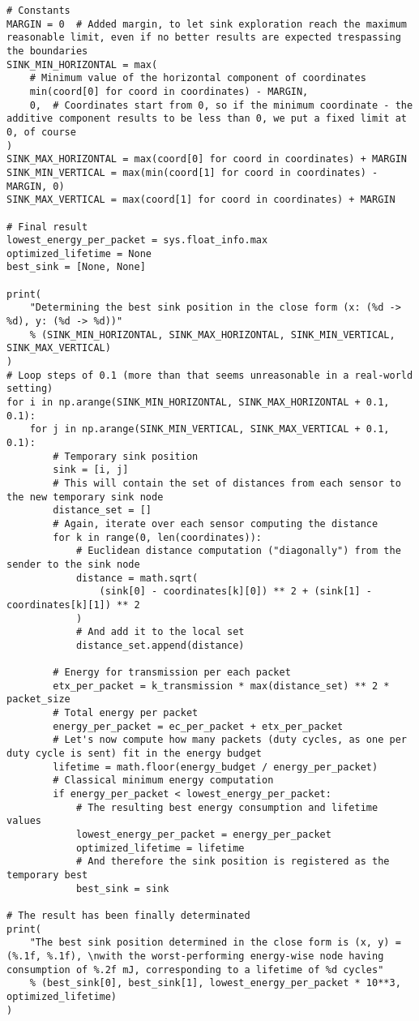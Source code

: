 \documentclass[a4paper,11pt]{article} %
\begin{document}
    \begin{verbatim}
# Constants
MARGIN = 0  # Added margin, to let sink exploration reach the maximum reasonable limit, even if no better results are expected trespassing the boundaries
SINK_MIN_HORIZONTAL = max(
    # Minimum value of the horizontal component of coordinates
    min(coord[0] for coord in coordinates) - MARGIN,
    0,  # Coordinates start from 0, so if the minimum coordinate - the additive component results to be less than 0, we put a fixed limit at 0, of course
)
SINK_MAX_HORIZONTAL = max(coord[0] for coord in coordinates) + MARGIN
SINK_MIN_VERTICAL = max(min(coord[1] for coord in coordinates) - MARGIN, 0)
SINK_MAX_VERTICAL = max(coord[1] for coord in coordinates) + MARGIN

# Final result
lowest_energy_per_packet = sys.float_info.max
optimized_lifetime = None
best_sink = [None, None]

print(
    "Determining the best sink position in the close form (x: (%d -> %d), y: (%d -> %d))"
    % (SINK_MIN_HORIZONTAL, SINK_MAX_HORIZONTAL, SINK_MIN_VERTICAL, SINK_MAX_VERTICAL)
)
# Loop steps of 0.1 (more than that seems unreasonable in a real-world setting)
for i in np.arange(SINK_MIN_HORIZONTAL, SINK_MAX_HORIZONTAL + 0.1, 0.1):
    for j in np.arange(SINK_MIN_VERTICAL, SINK_MAX_VERTICAL + 0.1, 0.1):
        # Temporary sink position
        sink = [i, j]
        # This will contain the set of distances from each sensor to the new temporary sink node
        distance_set = []
        # Again, iterate over each sensor computing the distance
        for k in range(0, len(coordinates)):
            # Euclidean distance computation ("diagonally") from the sender to the sink node
            distance = math.sqrt(
                (sink[0] - coordinates[k][0]) ** 2 + (sink[1] - coordinates[k][1]) ** 2
            )
            # And add it to the local set
            distance_set.append(distance)

        # Energy for transmission per each packet
        etx_per_packet = k_transmission * max(distance_set) ** 2 * packet_size
        # Total energy per packet
        energy_per_packet = ec_per_packet + etx_per_packet
        # Let's now compute how many packets (duty cycles, as one per duty cycle is sent) fit in the energy budget
        lifetime = math.floor(energy_budget / energy_per_packet)
        # Classical minimum energy computation
        if energy_per_packet < lowest_energy_per_packet:
            # The resulting best energy consumption and lifetime values
            lowest_energy_per_packet = energy_per_packet
            optimized_lifetime = lifetime
            # And therefore the sink position is registered as the temporary best
            best_sink = sink

# The result has been finally determinated
print(
    "The best sink position determined in the close form is (x, y) = (%.1f, %.1f), \nwith the worst-performing energy-wise node having consumption of %.2f mJ, corresponding to a lifetime of %d cycles"
    % (best_sink[0], best_sink[1], lowest_energy_per_packet * 10**3, optimized_lifetime)
)
    \end{verbatim}
\end{document}
